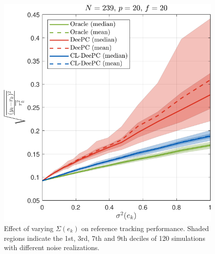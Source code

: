 \begin{figure}[t!]
\begin{center}
\includegraphics[width=\columnwidth]{results/figures/Varying_Re_0.0001-1-50_Nbar_239_p_20_f_20_Ru_1_Rdu_0_Q_100_R_0_dR_10.pdf}    %
\caption{Effect of varying $\Sigma(e_k)$ on reference tracking performance. Shaded regions indicate the 1st, 3rd, 7th and 9th deciles of 120 simulations with different noise realizations.}  %
\label{fig:varying_Re}                                 %
\end{center}                                 %
\end{figure}

